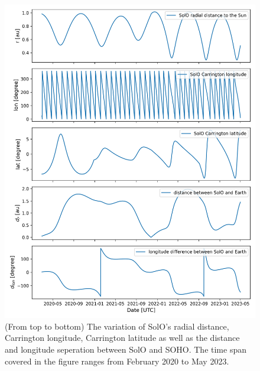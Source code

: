 



\begin{figure}
    \centering
    \includegraphics[width = \textwidth]{images/ACR/SOLO_orbit_helioscentric_3.png}
    \caption[The orbit variation of \ac{SolO} in carrington coordinate system]{(From top to bottom) The variation of \ac{SolO}'s radial distance, Carrington longitude, Carrington latitude as well as the distance and longitude seperation between \ac{SolO} and \ac{SOHO}. The time span covered in the figure ranges from February 2020 to May 2023. }
    \label{fig:SOLO_orbit_info}
\end{figure}
